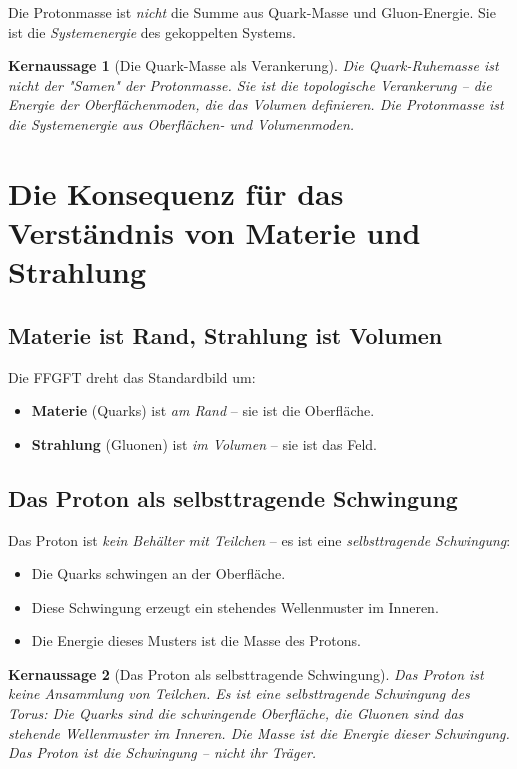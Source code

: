 \documentclass[11pt,a4paper]{article}
\newtheorem{keyresult}{Kernaussage}
\begin{document}
	Die Protonmasse ist \emph{nicht} die Summe aus Quark-Masse und Gluon-Energie. 
	Sie ist die \emph{Systemenergie} des gekoppelten Systems.
	
	\begin{keyresult}[Die Quark-Masse als Verankerung]
		Die Quark-Ruhemasse ist nicht der "Samen" der Protonmasse. 
		Sie ist die \emph{topologische Verankerung} -- die Energie der Oberflächenmoden, die das Volumen definieren. 
		Die Protonmasse ist die \emph{Systemenergie} aus Oberflächen- und Volumenmoden.
	\end{keyresult}
	
	\section{Die Konsequenz für das Verständnis von Materie und Strahlung}
	
	\subsection{Materie ist Rand, Strahlung ist Volumen}
	
	Die FFGFT dreht das Standardbild um:
	\begin{itemize}
		\item \textbf{Materie} (Quarks) ist \emph{am Rand} -- sie ist die Oberfläche.
		\item \textbf{Strahlung} (Gluonen) ist \emph{im Volumen} -- sie ist das Feld.
	\end{itemize}
	
	\subsection{Das Proton als selbsttragende Schwingung}
	
	Das Proton ist \emph{kein Behälter mit Teilchen} -- es ist eine \emph{selbsttragende Schwingung}:
	\begin{itemize}
		\item Die Quarks schwingen an der Oberfläche.
		\item Diese Schwingung erzeugt ein stehendes Wellenmuster im Inneren.
		\item Die Energie dieses Musters ist die Masse des Protons.
	\end{itemize}
	
	\begin{keyresult}[Das Proton als selbsttragende Schwingung]
		Das Proton ist keine Ansammlung von Teilchen. 
		Es ist eine \emph{selbsttragende Schwingung} des Torus: 
		Die Quarks sind die schwingende Oberfläche, die Gluonen sind das stehende Wellenmuster im Inneren. 
		Die Masse ist die Energie dieser Schwingung. 
		Das Proton ist die Schwingung -- nicht ihr Träger.
	\end{keyresult}
	
\end{document}
